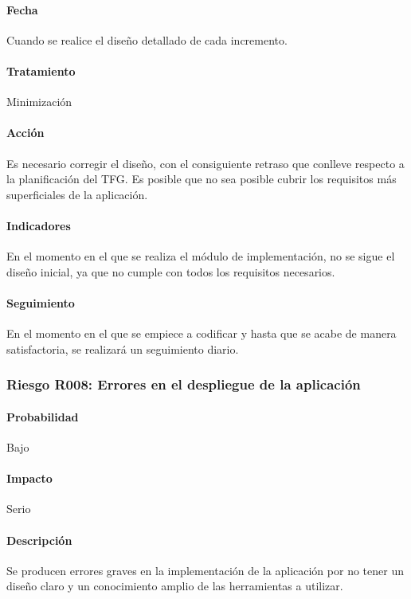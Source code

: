 \documentclass[10pt,a4paper]{article}
\begin{document}
				\paragraph{Fecha} Cuando se realice el diseño detallado de cada incremento.%
				\paragraph{Tratamiento} Minimización  %
				\paragraph{Acción} Es necesario corregir el diseño, con el consiguiente retraso que conlleve respecto a la planificación del TFG. Es posible que no sea posible cubrir los requisitos más superficiales de la aplicación.%
				\paragraph{Indicadores} En el momento en el que se realiza el módulo de implementación, no se sigue el diseño inicial, ya que no cumple con todos los requisitos necesarios. %
				\paragraph{Seguimiento}	En el momento en el que se empiece a codificar y hasta que se acabe de manera satisfactoria, se realizará un seguimiento diario. %
			
			\subsubsection{Riesgo R008: Errores en el despliegue de la aplicación}
				\paragraph{Probabilidad} Bajo
				\paragraph{Impacto}	Serio
				\paragraph{Descripción} Se producen errores graves en la implementación de la aplicación por no tener un diseño claro y un conocimiento amplio de las herramientas a utilizar.
\end{document}
